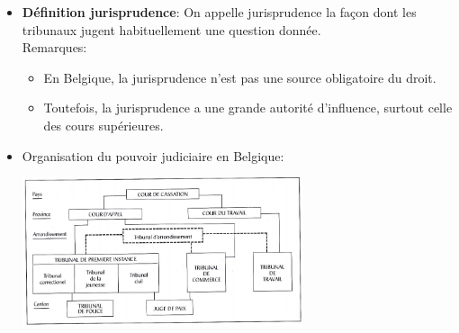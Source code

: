 \documentclass[a4paper]{article}
\begin{document}
\begin{itemize}





\item \textbf{Définition jurisprudence}: On appelle jurisprudence la façon dont les tribunaux jugent habituellement une question donnée. \\
Remarques:
\begin{itemize}
    \item En Belgique, la jurisprudence n’est pas une source obligatoire du droit.
    \item Toutefois, la jurisprudence a une grande autorité d’influence, surtout celle des cours supérieures.
\end{itemize}





\item Organisation du pouvoir judiciaire en Belgique:
\begin{center}
\includegraphics[width=0.65\textwidth]{images/organisation-judiciaire.PNG}
\end{center}






\end{itemize}
\end{document}
